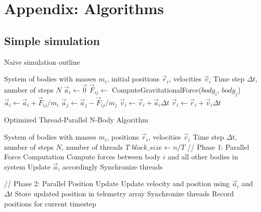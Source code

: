 \documentclass{article}
\begin{document}
\appendix
\newpage
\section{Appendix: Algorithms}

\subsection{Simple simulation}
\begin{algorithm}[H]
    \caption{Naive simulation outline}\label{alg:cap}
    \begin{algorithmic}
        \Require System of bodies with masses $m_i$, initial positions $\vec{r}_i$, velocities $\vec{v}_i$
        \Require Time step $\Delta t$, number of steps $N$
                \State $\vec{a}_i \gets \vec{0}$ 
            \EndFor
                    \State $\vec{F}_{ij} \gets$ ComputeGravitationalForce($body_i$, $body_j$)
                    \State $\vec{a}_i \gets \vec{a}_i + \vec{F}_{ij}/m_i$
                    \State $\vec{a}_j \gets \vec{a}_j - \vec{F}_{ij}/m_j$
                \EndFor
            \EndFor
                \State $\vec{v}_i \gets \vec{v}_i + \vec{a}_i\Delta t$ 
                \State $\vec{r}_i \gets \vec{r}_i + \vec{v}_i\Delta t$ 
            \EndFor
        \EndFor
    \end{algorithmic}
\end{algorithm}

\begin{algorithm}[H]
    \caption{Optimized Thread-Parallel N-Body Algorithm}\label{alg:optimized}
    \begin{algorithmic}[0]
        \Require System of bodies with masses $m_i$, positions $\vec{r}_i$, velocities $\vec{v}_i$
        \Require Time step $\Delta t$, number of steps $N$, number of threads $T$
        \State $block\_size \gets n/T$ 
            \State // Phase 1: Parallel Force Computation
                    \State Compute forces between body $i$ and all other bodies in system
                    \State Update $\vec{a}_i$ accordingly
                \EndFor
            \EndFor
            \State Synchronize threads
            
            \State // Phase 2: Parallel Position Update
                    \State Update velocity and position using $\vec{a}_i$ and $\Delta t$
                    \State Store updated position in telemetry array
                \EndFor
            \EndFor
            \State Synchronize threads
            \State Record positions for current timestep
        \EndFor
    \end{algorithmic}
\end{algorithm}
\end{document}
